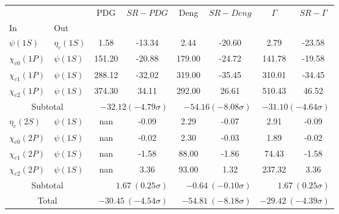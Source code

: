 \begin{tabular}{|l|l|c|c|c|c|c|c|}%
\hline%
&&PDG&$SR-PDG$&Deng&$SR-Deng$&$\Gamma$&$SR-\Gamma$\\%
In&Out&&&&&&\\%
\hline%
$\psi(1S)$&$\eta_{c}(1S)$&1.58&-13.34&2.44&-20.60&2.79&-23.58\\%
$\chi_{c0}(1P)$&$\psi(1S)$&151.20&-20.88&179.00&-24.72&141.78&-19.58\\%
$\chi_{c1}(1P)$&$\psi(1S)$&288.12&-32.02&319.00&-35.45&310.01&-34.45\\%
$\chi_{c2}(1P)$&$\psi(1S)$&374.30&34.11&292.00&26.61&510.43&46.52\\%
\hline%
\hline%
\multicolumn{2}{|c|}{Subtotal}&\multicolumn{2}{|r|}{$-32.12 (-4.79\sigma)$}&\multicolumn{2}{|r|}{$-54.16 (-8.08\sigma)$}&\multicolumn{2}{|r|}{$-31.10 (-4.64\sigma)$}\\%
\hline%
\hline%
$\eta_{c}(2S)$&$\psi(1S)$&nan&-0.09&2.29&-0.07&2.91&-0.09\\%
$\chi_{c0}(2P)$&$\psi(1S)$&nan&-0.02&2.30&-0.03&1.89&-0.02\\%
$\chi_{c1}(2P)$&$\psi(1S)$&nan&-1.58&88.00&-1.86&74.43&-1.58\\%
$\chi_{c2}(2P)$&$\psi(1S)$&nan&3.36&93.00&1.32&237.32&3.36\\%
\hline%
\hline%
\multicolumn{2}{|c|}{Subtotal}&\multicolumn{2}{|r|}{$1.67~(0.25\sigma)$}&\multicolumn{2}{|r|}{$-0.64~(-0.10\sigma)$}&\multicolumn{2}{|r|}{$1.67~(0.25\sigma)$}\\%
\hline%
\hline%
\multicolumn{2}{|c|}{Total}&\multicolumn{2}{|r|}{$-30.45~(-4.54\sigma)$}&\multicolumn{2}{|r|}{$-54.81~(-8.18\sigma)$}&\multicolumn{2}{|r|}{$-29.42~(-4.39\sigma)$}\\%
\hline%
\end{tabular}